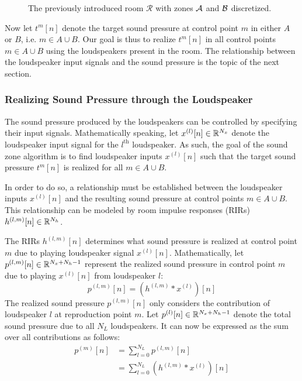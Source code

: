 \begin{figure}[t]
    \centering
    
    \caption{The previously introduced room $\mathcal{R}$ with zones $\mathcal{A}$ and $\mathcal{B}$ discretized.}
\end{figure}

Now let $t^{m}[n]$ denote the target sound pressure at control point $m$ in either $A$ or $B$, i.e. $m\in A \cup B$.
Our goal is thus to realize $t^{m}[n]$ in all control points $m\in A \cup B$ using the loudspeakers present in the room.
The relationship between the loudspeaker input signals and the sound pressure is the topic of the next section.

\subsubsection{Realizing Sound Pressure through the Loudspeaker}
The sound pressure produced by the loudspeakers can be controlled by specifying their input signals.
Mathematically speaking, let $x^{(l)}[n]\in\mathbb{R}^{N_x}$ denote the loudspeaker input signal for the $l^\text{th}$ loudspeaker.
As such, the goal of the sound zone algorithm is to find loudspeaker inputs $x^{(l)}[n]$ 
such that the target sound pressure $t^{m}[n]$ is realized for all $m\in A \cup B$.

In order to do so, a relationship must be established between the loudspeaker inputs $x^{(l)}[n]$
and the resulting sound pressure at control points $m\in A \cup B$. 
This relationship can be modeled by room impulse responses (RIRs) $h^{(l,m)}[n]\in\mathbb{R}^{N_h}$.

The RIRs $h^{(l,m)}[n]$ determines what sound pressure is realized at control point $m$ due to playing loudspeaker signal $x^{(l)}[n]$. 
Mathematically, let $p^{(l,m)}[n]\in\mathbb{R}^{N_x + N_h - 1}$ represent the realized sound pressure in control point $m$
due to playing $x^{(l)}[n]$ from loudspeaker $l$:
\begin{equation}
    p^{(l,m)}[n] = \left(h^{(l,m)} \ast x^{(l)}\right)[n]
\end{equation}
The realized sound pressure $p^{(l,m)}[n]$ only considers the contribution of loudspeaker $l$ at reproduction point $m$.
Let $p^{(l)}[n]\in\mathbb{R}^{N_x + N_h - 1}$ denote the total sound pressure due to all $N_L$ loudspeakers.
It can now be expressed as the sum over all contributions as follows: 
\begin{align}
    p^{(m)}[n] &= \sum_{l=0}^{N_L} p^{(l,m)}[n] \\
               &= \sum_{l=0}^{N_L} \left(h^{(l,m)} \ast x^{(l)}\right)[n]
\end{align}

